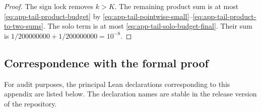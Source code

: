 \documentclass[11pt]{article}
\theoremstyle{definition}
\theoremstyle{remark}
\begin{document}
\begin{proof}
The sign lock removes $k>K$.  The remaining product sum is at most
\eqref{eq:app-tail-product-budget} by
\eqref{eq:app-tail-pointwise-small}--\eqref{eq:app-tail-product-to-two-sums}.
The solo term is at most \eqref{eq:app-tail-solo-budget-final}.  Their sum is
\(
 1/200000000+1/200000000=10^{-8}.
\)
\end{proof}

\subsection{Correspondence with the formal proof}

For audit purposes, the principal Lean declarations corresponding to this
appendix are listed below.  The declaration names are stable in the release
version of the repository.
\end{document}

